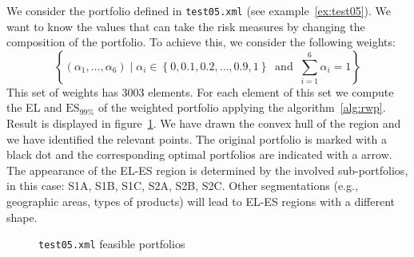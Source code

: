 \documentclass[11pt,fleqn]{book} %
\begin{document}
\begin{example}
	We consider the portfolio defined in \texttt{test05.xml} (see example~\ref{ex:test05}).
	We want to know the values that can take the risk measures by changing the 
	composition of the portfolio. To achieve this, we consider the following 
	weights:
	\begin{displaymath}
		\left\{
		\left( \alpha_1,\dots,\alpha_6 \right) \mid
		\alpha_i \in \left\{0, 0.1, 0.2,\dots,0.9,1 \right\}
		\ \text{ and }\ \displaystyle \sum_{i=1}^6 \alpha_i = 1
		\right\}
	\end{displaymath}
	This set of weights has \num{3003} elements. For each element of this set we
	compute the EL and $\text{ES}_{99\%}$ of the weighted portfolio applying the
	algorithm~\ref{alg:rwp}. Result is displayed in figure~\ref{fig:optim1}. We
	have drawn the convex hull of the region and we have identified the relevant 
	points. The original portfolio is marked with a black dot and the 
	corresponding optimal portfolios are indicated with a arrow. The appearance 
	of the EL-ES region is determined by the involved sub-portfolios, in this 
	case: S1A, S1B, S1C, S2A, S2B, S2C. Other segmentations (e.g., geographic 
	areas, types of products) will lead to EL-ES regions with a different shape. 
\end{example}

\begin{figure}[!ht]
	\centering
	\caption{\texttt{test05.xml} feasible portfolios}
	\label{fig:optim1}
\end{figure}
\end{document}
